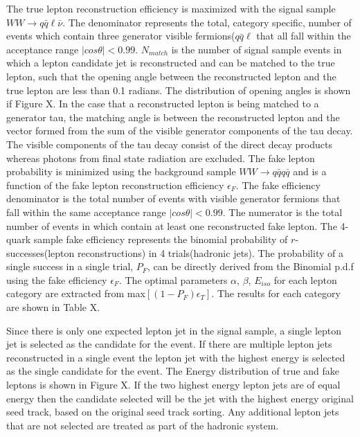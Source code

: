 The true lepton reconstruction efficiency is maximized with the signal sample $WW\rightarrow q\bar{q}\ell\bar{\nu}$. The denominator represents the total, category specific, number of events which contain three generator visible fermions($q\bar{q}\ell$ that all fall within the acceptance range $|cos\theta| < 0.99$. $N_{match}$ is the number of signal sample events in which a lepton candidate jet is reconstructed and can be matched to the true lepton, such that the opening angle between the reconstructed lepton and the true lepton are less than 0.1 radians. The distribution of opening angles is shown if Figure X. In the case that a reconstructed lepton is being matched to a generator tau, the matching angle is between the reconstructed lepton and the vector formed from the sum of the visible generator components of the tau decay. The visible components of the tau decay consist of the direct decay products whereas photons from final state radiation are excluded. The fake lepton probability is minimized using the background sample $WW\rightarrow q\bar{q}q\bar{q}$ and is a function of the fake lepton reconstruction efficiency $\epsilon_F$. The fake efficiency denominator is the total number of events with visible generator fermions that fall within the same acceptance range $|cos\theta| < 0.99$. The numerator is the total number of events in which contain at least one reconstructed fake lepton. The 4-quark sample fake efficiency represents the binomial probability of $r$-successes(lepton reconstructions) in 4 trials(hadronic jets). The probability of a single success in a single trial, $P_F$, can be directly derived from the Binomial p.d.f using the fake efficiency $\epsilon_F$. The optimal parameters $\alpha$, $\beta$, $E_{iso}$ for each lepton category are extracted from max$[(1-P_F)\epsilon_T]$. The results for each category are shown in Table X. 

Since there is only one expected lepton jet in the signal sample, a single lepton jet is selected as the candidate for the event. If there are multiple lepton jets reconstructed in a single event the lepton jet with the highest energy is selected as the single candidate for the event. The Energy distribution of true and fake leptons is shown in Figure X. If the two highest energy lepton jets are of equal energy then the candidate selected will be the jet with the highest energy original seed track, based on the original seed track sorting.  Any additional lepton jets that are not selected are treated as part of the hadronic system.


